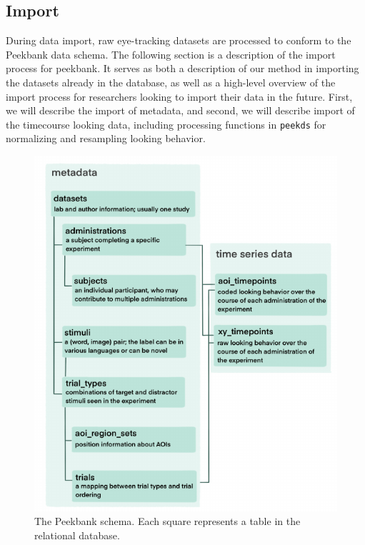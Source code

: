 \documentclass[
  english,
  man,floatsintext]{apa6}
\begin{document}
\hypertarget{import}{%
\subsection{Import}\label{import}}

During data import, raw eye-tracking datasets are processed to conform to the Peekbank data schema. The following section is a description of the import process for peekbank. It serves as both a description of our method in importing the datasets already in the database, as well as a high-level overview of the import process for researchers looking to import their data in the future. First, we will describe the import of metadata, and second, we will describe import of the timecourse looking data, including processing functions in \texttt{peekds} for normalizing and resampling looking behavior.

\begin{figure}

{\centering \includegraphics{peekbank-brm_files/figure-latex/fig-schema-1} 

}

\caption{The Peekbank schema. Each square represents a table in the relational database.}\label{fig:fig-schema}
\end{figure}
\end{document}

